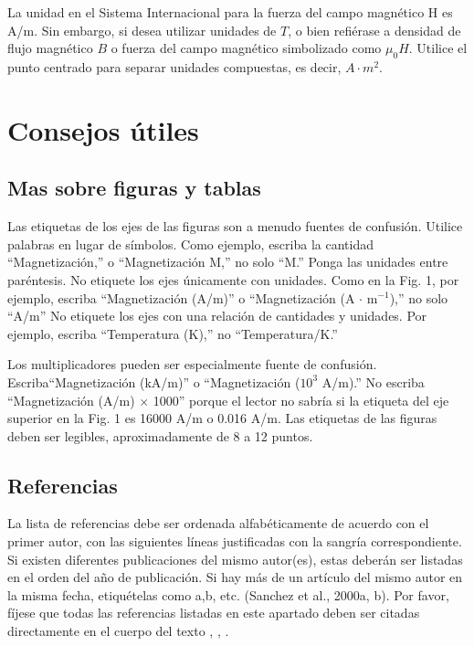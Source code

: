 \documentclass[5p,times,authoryear]{elsarticle}
\begin{document}
La unidad en el Sistema Internacional para la fuerza del campo magnético H es A/m. Sin embargo, si desea utilizar unidades de $T$, o bien refiérase a densidad de flujo magnético $B$ o fuerza del campo magnético simbolizado como $\mu_0 H$. Utilice el punto centrado para separar unidades compuestas,  es decir, $A\cdot m^2$.

\section{Consejos útiles}

\subsection{Mas sobre figuras y tablas}

Las etiquetas de los ejes de las figuras son a menudo fuentes de confusión. Utilice palabras en lugar de símbolos. Como ejemplo, escriba la cantidad ``Magnetización,'' o ``Magnetización M,'' no solo ``M.'' Ponga las unidades entre paréntesis. No etiquete los ejes únicamente con unidades. Como en la Fig. 1, por ejemplo, escriba ``Magnetización (A/m)'' o ``Magnetización (A $\cdot$ m$^{-1}$),'' no solo ``A/m'' No etiquete los ejes con una relación de cantidades y unidades. Por ejemplo, escriba ``Temperatura (K),'' no ``Temperatura/K.''

Los multiplicadores pueden ser especialmente fuente de confusión. Escriba``Magnetización (kA/m)'' o ``Magnetización ($10^3$ A/m).'' No escriba ``Magnetización (A/m) $\times$ 1000'' porque el lector no sabría si la etiqueta del eje superior en la Fig. 1 es 16000 A/m o 0.016 A/m. Las etiquetas de las figuras deben ser legibles, aproximadamente de 8 a 12 puntos.

\subsection{Referencias} %

La lista de referencias debe ser ordenada alfabéticamente de acuerdo con el primer autor, con las siguientes líneas justificadas con la sangría correspondiente. Si existen diferentes publicaciones del mismo autor(es), estas deberán ser listadas en el orden del año de publicación. Si hay más de un artículo del mismo autor en la misma fecha, etiquételas como a,b, etc. (Sanchez et al., 2000a, b). Por favor, fíjese que todas las referencias \citep{Garcia2008} listadas en este apartado deben ser citadas directamente en el cuerpo del texto \citep{Garcia2007}, \citep{Dog1958}, \citep{Keohane1958}.
\end{document}

